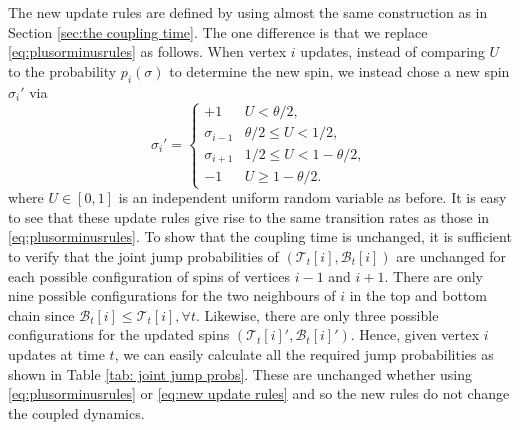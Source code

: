 	The new update rules are defined by using almost the same construction as in Section \ref{sec:the coupling time}. The one difference is that we replace \eqref{eq:plusorminusrules} as follows. When vertex $i$ updates, instead of comparing $U$ to the probability $p_i(\sigma)$ to determine the new spin, we instead chose a new spin $\sigma_i'$ via
	\begin{equation}
	\label{eq:new update rules}
		\sigma_i' = \begin{cases}
			+1 & U < \theta/2,\\
			\sigma_{i-1} & \theta/2 \leq U < 1/2,\\
			\sigma_{i+1} & 1/2 \leq U < 1 - \theta/2,\\
			-1 & U \geq 1 - \theta/2.
		\end{cases}
	\end{equation}
	where $U \in [0,1]$ is an independent uniform random variable as before. It is easy to see that these update rules give rise to the same transition rates as those in \eqref{eq:plusorminusrules}. To show that the coupling time is unchanged, it is sufficient to verify that the joint jump probabilities of $(\mathscr{T}_t[i], \mathscr{B}_t[i])$ are unchanged for each possible configuration of spins of vertices $i-1$ and $i+1$. There are only nine possible configurations for the two neighbours of $i$ in the top and bottom chain since $\mathscr{B}_t[i] \leq \mathscr{T}_t[i], \forall t$. Likewise, there are only three possible configurations for the updated spins $(\mathscr{T}_t[i]', \mathscr{B}_t[i]')$. Hence, given vertex $i$ updates at time $t$, we can easily calculate all the required jump probabilities as shown in Table \ref{tab: joint jump probs}. These are unchanged whether using \eqref{eq:plusorminusrules} or \eqref{eq:new update rules} and so the new rules do not change the coupled dynamics.

